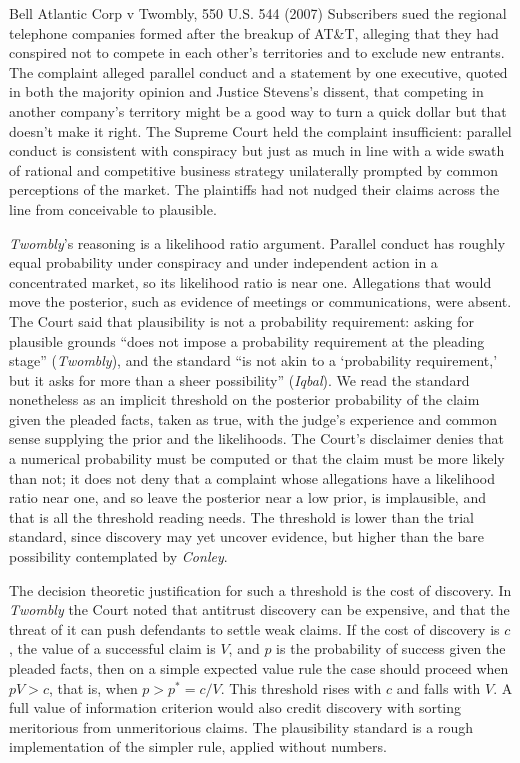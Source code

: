 \begin{casebox}{Bell Atlantic Corp v Twombly, 550 U.S. 544 (2007)}
Subscribers sued the regional telephone companies formed after the breakup of AT\&T, alleging that they had conspired not to compete in each other's territories and to exclude new entrants. The complaint alleged parallel conduct and a statement by one executive, quoted in both the majority opinion and Justice Stevens's dissent, that competing in another company's territory might be a good way to turn a quick dollar but that doesn't make it right. The Supreme Court held the complaint insufficient: parallel conduct is consistent with conspiracy but just as much in line with a wide swath of rational and competitive business strategy unilaterally prompted by common perceptions of the market. The plaintiffs had not nudged their claims across the line from conceivable to plausible.
\end{casebox}

\emph{Twombly}'s reasoning is a likelihood ratio argument. Parallel conduct has roughly equal probability under conspiracy and under independent action in a concentrated market, so its likelihood ratio is near one. Allegations that would move the posterior, such as evidence of meetings or communications, were absent. The Court said that plausibility is not a probability requirement: asking for plausible grounds ``does not impose a probability requirement at the pleading stage'' (\emph{Twombly}), and the standard ``is not akin to a `probability requirement,' but it asks for more than a sheer possibility'' (\emph{Iqbal}). We read the standard nonetheless as an implicit threshold on the posterior probability of the claim given the pleaded facts, taken as true, with the judge's experience and common sense supplying the prior and the likelihoods. The Court's disclaimer denies that a numerical probability must be computed or that the claim must be more likely than not; it does not deny that a complaint whose allegations have a likelihood ratio near one, and so leave the posterior near a low prior, is implausible, and that is all the threshold reading needs. The threshold is lower than the trial standard, since discovery may yet uncover evidence, but higher than the bare possibility contemplated by \emph{Conley}.

The decision theoretic justification for such a threshold is the cost of discovery. In \emph{Twombly} the Court noted that antitrust discovery can be expensive, and that the threat of it can push defendants to settle weak claims. If the cost of discovery is $c$, the value of a successful claim is $V$, and $p$ is the probability of success given the pleaded facts, then on a simple expected value rule the case should proceed when $pV > c$, that is, when $p > p^\ast = c/V$. This threshold rises with $c$ and falls with $V$. A full value of information criterion would also credit discovery with sorting meritorious from unmeritorious claims. The plausibility standard is a rough implementation of the simpler rule, applied without numbers.

